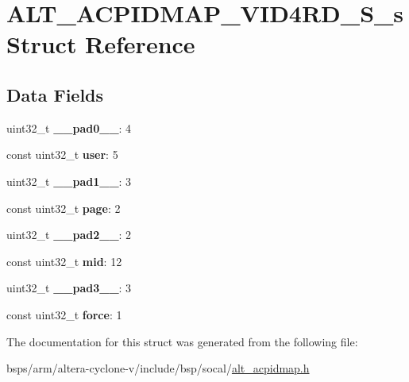 \hypertarget{structALT__ACPIDMAP__VID4RD__S__s}{}\section{A\+L\+T\+\_\+\+A\+C\+P\+I\+D\+M\+A\+P\+\_\+\+V\+I\+D4\+R\+D\+\_\+\+S\+\_\+s Struct Reference}
\label{structALT__ACPIDMAP__VID4RD__S__s}
\subsection*{Data Fields}
\begin{DoxyCompactItemize}
\item 
\mbox{\label{structALT__ACPIDMAP__VID4RD__S__s_a925829f2d27e4ad09a0a0507b02fd342}} 
uint32\+\_\+t {\bfseries \+\_\+\+\_\+pad0\+\_\+\+\_\+}\+: 4
\item 
\mbox{\label{structALT__ACPIDMAP__VID4RD__S__s_a2657a59abc53a44c44700f4894cc7138}} 
const uint32\+\_\+t {\bfseries user}\+: 5
\item 
\mbox{\label{structALT__ACPIDMAP__VID4RD__S__s_a850731d95ec32050a9b247d5c75b6a8c}} 
uint32\+\_\+t {\bfseries \+\_\+\+\_\+pad1\+\_\+\+\_\+}\+: 3
\item 
\mbox{\label{structALT__ACPIDMAP__VID4RD__S__s_a3140da15faa967cf6436c0b74cafeb7f}} 
const uint32\+\_\+t {\bfseries page}\+: 2
\item 
\mbox{\label{structALT__ACPIDMAP__VID4RD__S__s_a1355dc7351c037b276bf8dcae52646b6}} 
uint32\+\_\+t {\bfseries \+\_\+\+\_\+pad2\+\_\+\+\_\+}\+: 2
\item 
\mbox{\label{structALT__ACPIDMAP__VID4RD__S__s_ae3625e47fb81b871eed2a432aaaf13c4}} 
const uint32\+\_\+t {\bfseries mid}\+: 12
\item 
\mbox{\label{structALT__ACPIDMAP__VID4RD__S__s_a0834072504265651bed7be2d178494a1}} 
uint32\+\_\+t {\bfseries \+\_\+\+\_\+pad3\+\_\+\+\_\+}\+: 3
\item 
\mbox{\label{structALT__ACPIDMAP__VID4RD__S__s_af2caaa80b2ded113c76d47ca6f0924a6}} 
const uint32\+\_\+t {\bfseries force}\+: 1
\end{DoxyCompactItemize}


The documentation for this struct was generated from the following file\+:\begin{DoxyCompactItemize}
\item 
bsps/arm/altera-\/cyclone-\/v/include/bsp/socal/\mbox{\hyperlink{alt__acpidmap_8h}{alt\+\_\+acpidmap.\+h}}\end{DoxyCompactItemize}
